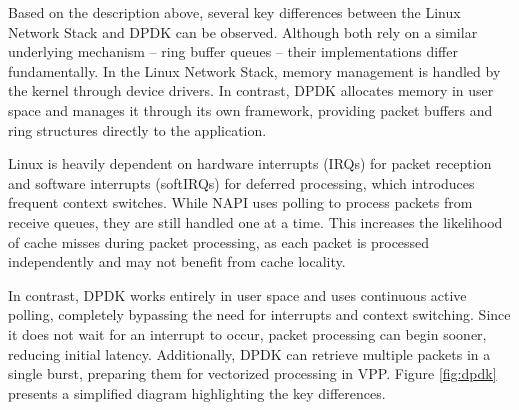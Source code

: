 Based on the description above, several key differences between the Linux Network Stack and DPDK can be observed.
Although both rely on a similar underlying mechanism -- ring buffer queues -- their implementations differ fundamentally.
In the Linux Network Stack, memory management is handled by the kernel through device drivers. 
In contrast, DPDK allocates memory in user space and manages it through its own framework, providing packet buffers and ring structures directly to the application.

Linux is heavily dependent on hardware interrupts (IRQs) for packet reception and software interrupts (softIRQs) for deferred processing, which introduces frequent context switches. 
While NAPI uses polling to process packets from receive queues, they are still handled one at a time.
This increases the likelihood of cache misses during packet processing, as each packet is processed independently and may not benefit from cache locality.

In contrast, DPDK works entirely in user space and uses continuous active polling, completely bypassing the need for interrupts and context switching. 
Since it does not wait for an interrupt to occur, packet processing can begin sooner, reducing initial latency. 
Additionally, DPDK can retrieve multiple packets in a single burst, preparing them for vectorized processing in VPP.
Figure \ref{fig:dpdk} presents a simplified diagram highlighting the key differences.
